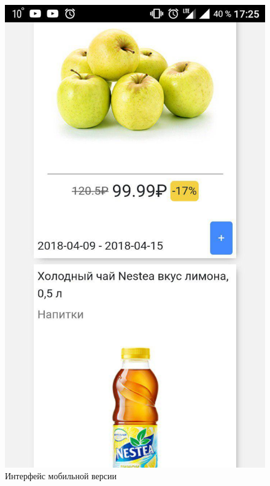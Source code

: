 \begin{figure}[H]
    \includegraphics[width=\textwidth]{./screenshots/interface_small.jpg}
    \caption{Интерфейс мобильной версии}
    \endminipage
\end{figure}



